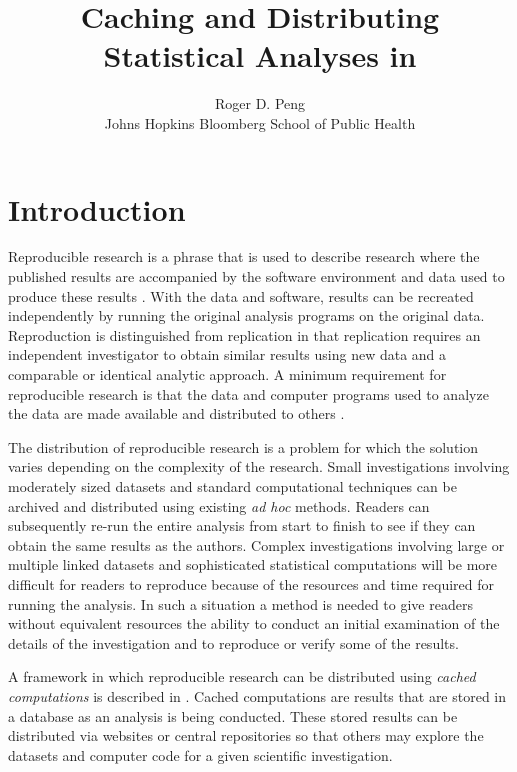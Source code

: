 \documentclass[nojss]{jss}
\author{Roger D. Peng\\
  Johns Hopkins Bloomberg School of Public Health}
\title{Caching and Distributing Statistical Analyses in \proglang{R}}
\begin{document}
\section{Introduction}

Reproducible research is a phrase that is used to describe research
where the published results are accompanied by the software
environment and data used to produce these
results \citep{buck:dono:1995,schw:karr:clae:2000,gent:temp:2007}.
With the data and software, results can be recreated independently by
running the original analysis programs on the original data.
Reproduction is distinguished from replication in that replication
requires an independent investigator to obtain similar results using
new data and a comparable or identical analytic approach.  A minimum
requirement for reproducible research is that the data and computer
programs used to analyze the data are made available and distributed
to others \citep{peng:domi:zege:2006}.

The distribution of reproducible research is a problem for which the
solution varies depending on the complexity of the research.  Small
investigations involving moderately sized datasets and standard
computational techniques can be archived and distributed using
existing \textit{ad hoc} methods.  Readers can subsequently re-run the
entire analysis from start to finish to see if they can obtain the
same results as the authors.  Complex investigations involving large
or multiple linked datasets and sophisticated statistical computations
will be more difficult for readers to reproduce because of the
resources and time required for running the analysis.  In such a
situation a method is needed to give readers without equivalent
resources the ability to conduct an initial examination of the details
of the investigation and to reproduce or verify some of the results.

A framework in which reproducible research can be distributed using
\textit{cached computations} is described in \cite{peng:ecke:2007}.
Cached computations are results that are stored in a database as an
analysis is being conducted.  These stored results can be distributed
via websites or central repositories so that others may explore the
datasets and computer code for a given scientific investigation.
\end{document}
